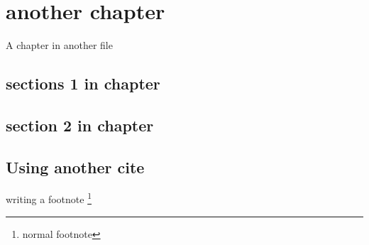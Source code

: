 \chapter{another chapter}
A chapter in another file
\section{sections 1 in chapter}
\section{section 2 in chapter}
\section{Using another cite \cite{lesk:1977}}

writing a footnote \footnote{normal footnote}
